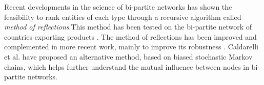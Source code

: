Recent developments in the science of bi-partite networks has shown the feasibility to rank entities of each type through a recursive algorithm called  {\it method of reflections}.This method has been tested on the bi-partite network of countries exporting products \cite{hidalgo2007,hidalgo2009}. The method of reflections has been improved and complemented in more recent work, mainly to improve its robustness \cite{tacchella2012new, cristelli2012competitors, tacchella2013economic, cristelli2013measuring}. Caldarelli et al. \cite{caldarelli2012network} have proposed an alternative method, based on biased stochastic Markov chains, which helps further understand the mutual influence between nodes in bi-partite networks.









